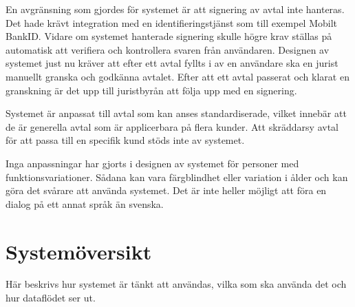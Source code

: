 \documentclass[a4paper,12pt]{article}
\begin{document}

En avgränsning som gjordes för systemet är att signering av avtal inte hanteras. Det hade krävt integration med en identifieringstjänst som till exempel Mobilt BankID. Vidare om systemet hanterade signering skulle högre krav ställas på automatisk att verifiera och kontrollera svaren från användaren. Designen av systemet just nu kräver att efter ett avtal fyllts i av en användare ska en jurist manuellt granska och godkänna avtalet. Efter att ett avtal passerat och klarat en granskning är det upp till juristbyrån att följa upp med en signering.


Systemet är anpassat till avtal som kan anses standardiserade, vilket innebär att de är generella avtal som är applicerbara på flera kunder. Att skräddarsy avtal för att passa till en specifik kund stöds inte av systemet. 

Inga anpassningar har gjorts i designen av systemet för personer med funktionsvariationer. Sådana kan vara färgblindhet eller variation i ålder och kan göra det svårare att använda systemet. Det är inte heller möjligt att föra en dialog på ett annat språk än svenska.


\section{Systemöversikt}
\FloatBarrier

Här beskrivs hur systemet är tänkt att användas, vilka som ska använda det och hur dataflödet ser ut.
\end{document}
